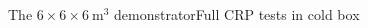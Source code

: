 \documentclass[10pt]{beamer}
\begin{document}
\begin{frame}{The \texorpdfstring{$6 \times 6 \times \SI{6}{\meter\cubed}$}{666} demonstrator}{Full CRP tests in cold box}
\begin{columns}
\begin{column}{0.6\textwidth}
    		\end{column}
    	\end{columns}
	    \end{frame}
       
\end{document}
